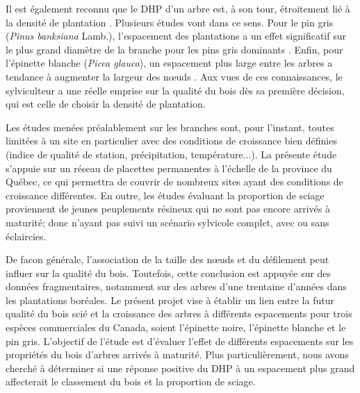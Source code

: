 \documentclass[letterpaper, 12pt]{article}
\begin{document}
\begin{onehalfspace}
\vspace{12pt}

Il est également reconnu que le DHP d'un arbre est, à son tour, étroitement lié à la densité de plantation \cite{Pregent1998}. Plusieurs études vont dans ce sens. Pour le pin gris (\textit{Pinus banksiana} Lamb.), l'espacement des plantations a un effet significatif sur le plus grand diamètre de la branche pour les pins gris dominants \cite{Hebert2016}. Enfin, pour l'épinette blanche (\textit{Picea glauca}), un espacement plus large entre les arbres a tendance à augmenter la largeur des nœuds \cite{Tong2013}. Aux vues de ces connaissances, le sylviculteur a une réelle emprise sur la qualité du bois dès sa première décision, qui est celle de choisir la densité de plantation.

\vspace{12pt}

Les études menées préalablement sur les branches sont, pour l'instant, toutes limitées à un site en particulier avec des conditions de croissance bien définies (indice de qualité de station, précipitation, température...). La présente étude s’appuie sur un réseau de placettes permanentes à l’échelle de la province du Québec, ce qui permettra de couvrir de nombreux sites ayant des conditions de croissance différentes. En outre, les études évaluant la proportion de sciage proviennent de jeunes peuplements résineux qui ne sont pas encore arrivés à maturité; donc n’ayant pas suivi un scénario sylvicole complet, avec ou sans éclaircies. 

\vspace{12pt}

De facon générale, l'association de la taille des nœuds et du défilement peut influer sur la qualité du bois. Toutefois, cette conclusion est appuyée sur des données fragmentaires, notamment sur des arbres d'une trentaine d'années dans les plantations boréales. Le présent projet vise à établir un lien entre la futur qualité du bois scié et la croissance des arbres à différents espacements pour trois espèces commerciales du Canada, soient l'épinette noire, l'épinette blanche et le pin gris. L'objectif de l'étude est d'évaluer l'effet de différents espacements sur les propriétés du bois d'arbres arrivés à maturité. Plus particulièrement, nous avons cherché à déterminer si une réponse positive du DHP à un espacement plus grand affecterait le classement du bois et la proportion de sciage.

\vspace{12pt}


\end{onehalfspace}
\end{document}
